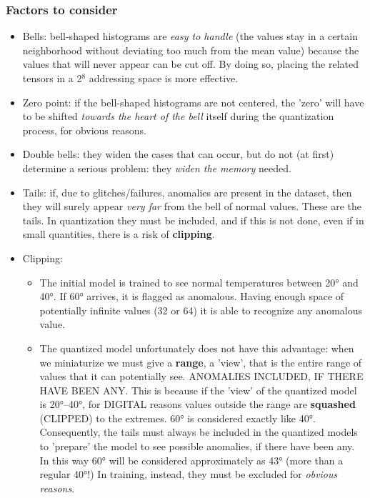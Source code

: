 \subsubsection{Factors to consider}

\begin{itemize}
    \item Bells: bell-shaped histograms are \textit{easy to handle} (the values stay in a certain neighborhood without deviating too much from the mean value) because the values that will never appear can be cut off. By doing so, placing the related tensors in a 2$^8$ addressing space is more effective. 
    \item Zero point: if the bell-shaped histograms are not centered, the 'zero' will have to be shifted \textit{towards the heart of the bell} itself during the quantization process, for obvious reasons.
    \item Double bells: they widen the cases that can occur, but do not (at first) determine a serious problem: they \textit{widen the memory} needed.
    \item Tails: if, due to glitches/failures, anomalies are present in the dataset, then they will surely appear \textit{very far} from the bell of normal values. These are the tails. In quantization they must be included, and if this is not done, even if in small quantities, there is a risk of \textbf{clipping}.
    \item Clipping: 
    \begin{itemize}
        \item The initial model is trained to see normal temperatures between 20° and 40°. If 60° arrives, it is flagged as anomalous. Having enough space of potentially infinite values (32 or 64) it is able to recognize any anomalous value.
        \item The quantized model unfortunately does not have this advantage: when we miniaturize we must give a \textbf{range}, a 'view', that is the entire range of values that it can potentially see. ANOMALIES INCLUDED, IF THERE HAVE BEEN ANY. This is because if the 'view' of the quantized model is 20°–40°, for DIGITAL reasons values outside the range are \textbf{squashed} (CLIPPED) to the extremes. 60° is considered exactly like 40°. Consequently, the tails must always be included in the quantized models to 'prepare' the model to see possible anomalies, if there have been any. In this way 60° will be considered approximately as 43° (more than a regular 40°!) In training, instead, they must be excluded for \textit{obvious reasons}.

\end{itemize}
\end{itemize}
